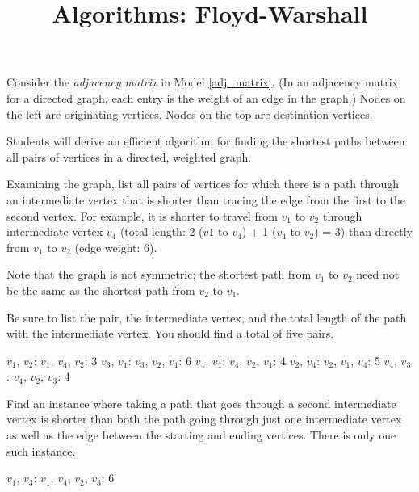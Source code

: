 \documentclass{tufte-handout}
\title{Algorithms: Floyd-Warshall}
\date{}
\begin{document}
\maketitle

\begin{questions}

\item Consider the \emph{adjacency matrix} in Model \ref{adj_matrix}. (In an adjacency matrix for a directed graph, each entry is the weight of an edge in the graph.) Nodes on the left are originating vertices. Nodes on the top are destination vertices.

\begin{objective}
  Students will derive an efficient algorithm for finding the shortest paths between all pairs of vertices in a directed, weighted graph.
\end{objective}

Examining the graph, list all pairs of vertices for which  there is a path through an intermediate vertex that is shorter than tracing the edge from the first to the second vertex. For example, it is shorter to travel from $v_1$ to $v_2$ through intermediate vertex $v_4$ (total length: 2 ($v1$ to $v_4$) + 1 ($v_4$ to $v_2$) = 3) than directly from $v_1$ to $v_2$ (edge weight: 6). 

Note that the graph is not symmetric; the shortest path from $v_1$ to $v_2$ need not be the same as the shortest path from $v_2$ to $v_1$. \label{inter_1}

Be sure to list the pair, the intermediate vertex, and the total length of the path with the intermediate vertex. You should find a total of five pairs.

{\color{red}
 $v_1$, $v_2$: $v_1$, $v_4$, $v_2$: 3
 $v_3$, $v_1$: $v_3$, $v_2$, $v_1$: 6
 $v_4$, $v_1$: $v_4$, $v_2$, $v_1$: 4
 $v_2$, $v_4$: $v_2$, $v_1$, $v_4$: 5
 $v_4$, $v_3$: $v_4$, $v_2$, $v_3$: 4
}

\item Find an instance where taking a path that goes through a second intermediate vertex is shorter than both the path going through just one intermediate vertex as well as the edge between the starting and ending vertices. There is only one such instance. \label{inter_2}

{\color{red}
 $v_1$, $v_3$: $v_1$, $v_4$, $v_2$, $v_3$: 6
}


\end{questions}
\end{document}
